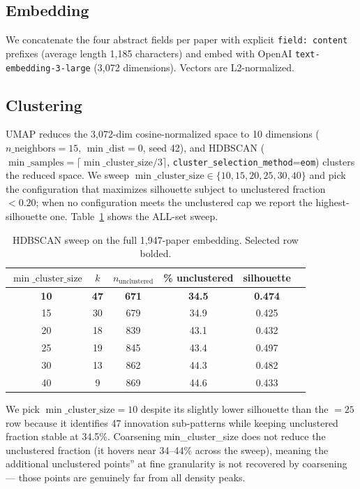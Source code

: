 \documentclass[10pt,a4paper]{article}
\begin{document}
\subsection{Embedding}

We concatenate the four abstract fields per paper with explicit \texttt{field: content} prefixes (average length 1{,}185 characters) and embed with OpenAI \texttt{text-embedding-3-large} (3{,}072 dimensions). Vectors are L2-normalized.

\subsection{Clustering}

UMAP reduces the 3{,}072-dim cosine-normalized space to 10 dimensions ($n\_\text{neighbors}{=}15$, $\min\_\text{dist}{=}0$, seed 42), and HDBSCAN ($\min\_\text{samples}{=}\lceil \min\_\text{cluster\_size}/3 \rceil$, \texttt{cluster\_selection\_method}=\texttt{eom}) clusters the reduced space. We sweep $\min\_\text{cluster\_size}\in\{10,15,20,25,30,40\}$ and pick the configuration that maximizes silhouette subject to unclustered fraction $<0.20$; when no configuration meets the unclustered cap we report the highest-silhouette one. Table~\ref{tab:sweep} shows the ALL-set sweep.

\begin{table}[htbp]
\centering
\caption{HDBSCAN sweep on the full 1{,}947-paper embedding. Selected row bolded.}
\label{tab:sweep}
\small
\begin{tabular}{cccccc}
\toprule
$\min\_\text{cluster\_size}$ & $k$ & $n_\text{unclustered}$ & \% unclustered & silhouette \\
\midrule
\textbf{10} & \textbf{47} & \textbf{671} & \textbf{34.5} & \textbf{0.474} \\
15 & 30 & 679 & 34.9 & 0.425 \\
20 & 18 & 839 & 43.1 & 0.432 \\
25 & 19 & 845 & 43.4 & 0.497 \\
30 & 13 & 862 & 44.3 & 0.482 \\
40 &  9 & 869 & 44.6 & 0.433 \\
\bottomrule
\end{tabular}
\end{table}

We pick $\min\_\text{cluster\_size}{=}10$ despite its slightly lower silhouette than the $=25$ row because it identifies 47 innovation sub-patterns while keeping unclustered fraction stable at 34.5\%. Coarsening min\_cluster\_size does not reduce the unclustered fraction (it hovers near 34--44\% across the sweep), meaning the additional unclustered points'' at fine granularity is not recovered by coarsening --- those points are genuinely far from all density peaks.
\end{document}
